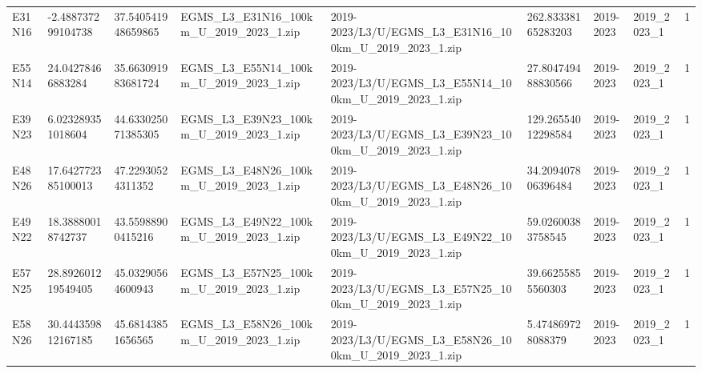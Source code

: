 \begin{landscape}
\begin{longtable}{lllllllll}
E31N16 & -2.488737299104738 & 37.540541948659865 & EGMS\_L3\_E31N16\_100km\_U\_2019\_2023\_1.zip & 2019-2023/L3/U/EGMS\_L3\_E31N16\_100km\_U\_2019\_2023\_1.zip & 262.83338165283203 & 2019-2023 & 2019\_2023\_1 & 1 \\
E55N14 & 24.04278466883284 & 35.663091983681724 & EGMS\_L3\_E55N14\_100km\_U\_2019\_2023\_1.zip & 2019-2023/L3/U/EGMS\_L3\_E55N14\_100km\_U\_2019\_2023\_1.zip & 27.804749488830566 & 2019-2023 & 2019\_2023\_1 & 1 \\
E39N23 & 6.023289351018604 & 44.633025071385305 & EGMS\_L3\_E39N23\_100km\_U\_2019\_2023\_1.zip & 2019-2023/L3/U/EGMS\_L3\_E39N23\_100km\_U\_2019\_2023\_1.zip & 129.26554012298584 & 2019-2023 & 2019\_2023\_1 & 1 \\
E48N26 & 17.642772385100013 & 47.22930524311352 & EGMS\_L3\_E48N26\_100km\_U\_2019\_2023\_1.zip & 2019-2023/L3/U/EGMS\_L3\_E48N26\_100km\_U\_2019\_2023\_1.zip & 34.209407806396484 & 2019-2023 & 2019\_2023\_1 & 1 \\
E49N22 & 18.38880018742737 & 43.55988900415216 & EGMS\_L3\_E49N22\_100km\_U\_2019\_2023\_1.zip & 2019-2023/L3/U/EGMS\_L3\_E49N22\_100km\_U\_2019\_2023\_1.zip & 59.02600383758545 & 2019-2023 & 2019\_2023\_1 & 1 \\
E57N25 & 28.892601219549405 & 45.03290564600943 & EGMS\_L3\_E57N25\_100km\_U\_2019\_2023\_1.zip & 2019-2023/L3/U/EGMS\_L3\_E57N25\_100km\_U\_2019\_2023\_1.zip & 39.66255855560303 & 2019-2023 & 2019\_2023\_1 & 1 \\
E58N26 & 30.444359812167185 & 45.68143851656565 & EGMS\_L3\_E58N26\_100km\_U\_2019\_2023\_1.zip & 2019-2023/L3/U/EGMS\_L3\_E58N26\_100km\_U\_2019\_2023\_1.zip & 5.474869728088379 & 2019-2023 & 2019\_2023\_1 & 1 \\
\bottomrule
\end{longtable}
\end{landscape}

